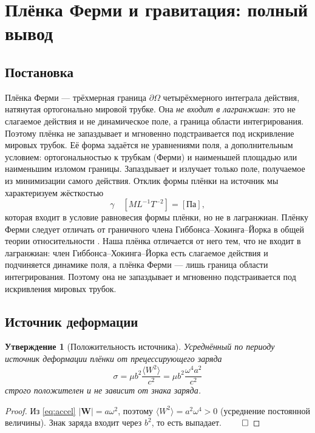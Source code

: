 \documentclass[12pt,a4paper]{article}
\newtheorem{proposition}{Утверждение}
\begin{document}
\section{Плёнка Ферми и гравитация: полный вывод}

\subsection{Постановка}
Плёнка Ферми --- трёхмерная граница $\partial\Omega$ четырёхмерного интеграла
действия, натянутая ортогонально мировой трубке. Она \emph{не входит в
лагранжиан}: это не слагаемое действия и не динамическое поле, а граница области
интегрирования. Поэтому плёнка не запаздывает и мгновенно подстраивается под
искривление мировых трубок. Её форма задаётся не уравнениями поля, а
дополнительным условием: ортогональностью к трубкам (Ферми) и наименьшей
площадью или наименьшим изломом границы. Запаздывает и излучает только поле,
получаемое из минимизации самого действия. Отклик формы плёнки на источник мы
характеризуем жёсткостью
\begin{equation}
\gamma\quad[ML^{-1}T^{-2}]=[\text{Па}],
\end{equation}
которая входит в условие равновесия формы плёнки, но не в лагранжиан. Плёнку Ферми следует отличать от граничного члена Гиббонса--Хокинга--Йорка в
общей теории относительности \cite{hehl1995}. Наша плёнка отличается от него тем,
что не входит в лагранжиан: член Гиббонса--Хокинга--Йорка есть слагаемое
действия и подчиняется динамике поля, а плёнка Ферми --- лишь граница области
интегрирования. Поэтому она не запаздывает и мгновенно подстраивается под
искривления мировых трубок.

\subsection{Источник деформации}
\begin{proposition}[Положительность источника]
Усреднённый по периоду источник деформации плёнки от прецессирующего заряда
\begin{equation}
\sigma = \mu b^2 \frac{\langle W^2\rangle}{c^2}
= \mu b^2 \frac{\omega^4 a^2}{c^2}
\end{equation}
строго положителен и не зависит от знака заряда.
\end{proposition}
\begin{proof}
Из \eqref{eq:accel} $|\mathbf{W}|=a\omega^2$, поэтому $\langle W^2\rangle=
a^2\omega^4>0$ (усреднение постоянной величины). Знак заряда входит через $b^2$,
то есть выпадает. $\qed$
\end{proof}
\end{document}
